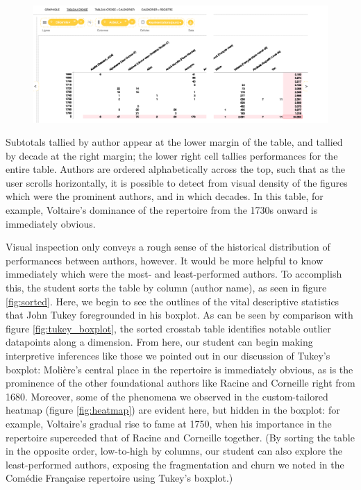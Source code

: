 \documentclass[	DIV=calc,%
							paper=a4,%
							fontsize=11pt,%
							twocolumn]{scrartcl}	 					%
\begin{document}
\begin{figure}
  \centering
	\includegraphics[width=7in]{steps/stitched-author-table.png}
	\caption{}
	\label{fig:stitched-author-table}
\end{figure}

Subtotals tallied by author appear at the lower margin of the table, and tallied by decade at the right margin; the lower right cell tallies performances for the entire table.  Authors are ordered alphabetically across the top, such that as the user scrolls horizontally, it is possible to detect from visual density of the figures which were the prominent authors, and in which decades.  In this table, for example, Voltaire’s dominance of the repertoire from the 1730s onward is immediately obvious.

Visual inspection only conveys a rough sense of the historical distribution of performances between authors, however.  It would be more helpful to know immediately which were the most- and least-performed authors.  To accomplish this, the student sorts the table by column (author name), as seen in figure \ref{fig:sorted}.  Here, we begin to see the outlines of the vital descriptive statistics that John Tukey foregrounded in his boxplot.  As can be seen by comparison with figure \ref{fig:tukey_boxplot}, the sorted crosstab table identifies notable outlier datapoints along a dimension.  From here, our student can begin making interpretive inferences like those we pointed out in our discussion of Tukey’s boxplot: Molière’s central place in the repertoire is immediately obvious, as is the prominence of the other foundational authors like Racine and Corneille right from 1680.  Moreover, some of the phenomena we observed in the custom-tailored heatmap (figure \ref{fig:heatmap}) are evident here, but hidden in the boxplot: for example, Voltaire’s gradual rise to fame at 1750, when his importance in the repertoire superceded that of Racine and Corneille together.  (By sorting the table in the opposite order, low-to-high by columns, our student can also explore the least-performed authors, exposing  the fragmentation and churn we noted in the Comédie Française repertoire using Tukey’s boxplot.)
\end{document}
